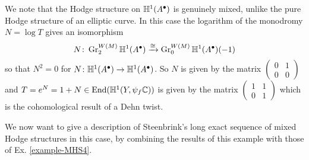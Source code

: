 \documentclass[../main.tex]{subfiles}
\begin{document}
\begin{es}
We note that the Hodge structure on $\mathbb{H}^1(A^\bullet)$ is genuinely mixed, unlike the pure Hodge structure of an elliptic curve.
In this case the logarithm of the monodromy $N=\log T$ gives an isomorphism
     \[
     N \colon \operatorname{Gr}^{W(M)}_{2} \mathbb{H}^1(A^\bullet) \xrightarrow{\cong} \operatorname{Gr}^{W(M)}_{0} \mathbb{H}^1(A^\bullet)(-1)
\]
so that $N^2=0$ for $N \colon \mathbb{H}^1(A^\bullet) \to \mathbb{H}^1(A^\bullet) $. So $N$ is given by the matrix
$\begin{pmatrix} 0 & 1\\ 0 & 0\end{pmatrix}$ 
and $T=e^N=1+N\in \operatorname{End}(\mathbb{H}^1(Y,\psi_f\mathbb{C}))$ is given by the matrix
$\begin{pmatrix} 1 & 1\\ 0 & 1\end{pmatrix}$
which is the cohomological result of a Dehn twist.

We now want to give a description of Steenbrink's long exact sequence of mixed Hodge structures in this case, by combining the results of this example with those of Ex. \ref{example-MHS4}.


\end{es}
\end{document}
